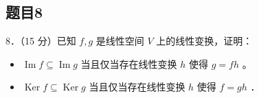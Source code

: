 \documentclass{article}
\begin{document}
\subsection{题目8}
8．（15 分）已知 \(f, g\) 是线性空间 \(V\) 上的线性变换，证明：

\begin{itemize}
  \item[（1）] \(\operatorname{Im} f \subseteq \operatorname{Im} g\) 当且仅当存在线性变换 \(h\) 使得 \(g=f h\) 。
  \item[（2）] \(\operatorname{Ker} f \subseteq \operatorname{Ker} g\) 当且仅当存在线性变换 \(h\) 使得 \(f=g h\) ．
\end{itemize}
\end{document}
